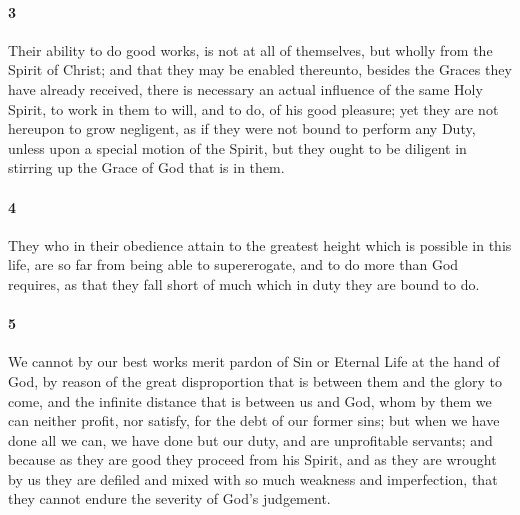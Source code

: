 \documentclass[
    paper=letterpaper,
    11pt,
    twoside,
    DIV=calc,
    openany
]{scrbook}
\newcommand{\ERRATA}[1]{}
\newcommand{\oldgrammar}[2]{#2}
\begin{document}
\footnotebegin
{}
\footnoteend

\paragraph{3} %
Their ability to do good works, is not at all of themselves, but wholly from the Spirit \R{}of Christ; and that they may be enabled thereunto, besides the Graces they have already received, there is necessary an \R{}actual influence of the same Holy Spirit, to work in them to will, and to do, of his good pleasure; yet they are not hereupon to grow negligent, as if they were not bound to perform any Duty, unless upon a special motion of the Spirit, but they ought to be diligent in \R{}stirring up the Grace of God that is in them.

\footnotebegin
\ERRATA{
1688: John 15:4,6
1719, lbcw, Reni: John 15:4,5
}
\footnoteend

\paragraph{4} %
They who in their obedience attain to the greatest height which is possible in this life, are so far from being able to \oldgrammar{superrogate}{supererogate}, and to do more than God requires, as that \R{}they fall short of much which in duty they are bound to do.

\footnotebegin
{}
\footnoteend

\paragraph{5} %
We cannot by our best works merit pardon of Sin or Eternal Life at the hand of God, by reason of the great disproportion that is between them and the glory to come, and the infinite distance that is between us and God, whom by them we can neither profit, nor satisfy, for the debt of our \R{}former sins; but when we have done all we can, we have done but our duty, and are unprofitable servants; and because as they are good they proceed from his \R{}Spirit, and as they are wrought by us they are defiled \R{}and mixed with so much weakness and imperfection, that they cannot endure the severity of God’s judgement.
\end{document}

